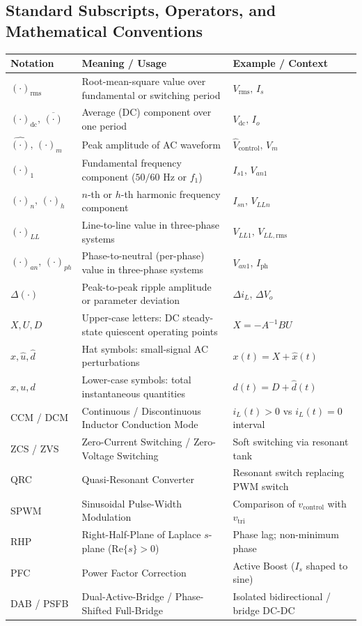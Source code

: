 \subsection{Standard Subscripts, Operators, and Mathematical Conventions}
\begin{center}
\begin{tabular}{@{}l p{9.0cm} p{5.5cm}@{}}
\toprule
\textbf{Notation} & \textbf{Meaning / Usage} & \textbf{Example / Context} \\
\midrule
$(\cdot)_{\mathrm{rms}}$ & Root-mean-square value over fundamental or switching period & $V_{\mathrm{rms}},\, I_s$ \\
$(\cdot)_{\mathrm{dc}},\, \overline{(\cdot)}$ & Average (DC) component over one period & $V_{\mathrm{dc}},\, I_o$ \\
$\hat{(\cdot)},\, (\cdot)_m$ & Peak amplitude of AC waveform & $\hat{V}_{\mathrm{control}},\, V_m$ \\
$(\cdot)_1$ & Fundamental frequency component ($50/60\text{ Hz}$ or $f_1$) & $I_{s1},\, V_{an1}$ \\
$(\cdot)_n,\, (\cdot)_h$ & $n$-th or $h$-th harmonic frequency component & $I_{sn},\, V_{LLn}$ \\
$(\cdot)_{LL}$ & Line-to-line value in three-phase systems & $V_{LL1},\, V_{LL,\mathrm{rms}}$ \\
$(\cdot)_{an},\, (\cdot)_{ph}$ & Phase-to-neutral (per-phase) value in three-phase systems & $V_{an1},\, I_{\mathrm{ph}}$ \\
$\Delta(\cdot)$ & Peak-to-peak ripple amplitude or parameter deviation & $\Delta i_L,\, \Delta V_o$ \\
$X, U, D$ & Upper-case letters: DC steady-state quiescent operating points & $X = -A^{-1}BU$ \\
$\hat{x}, \hat{u}, \hat{d}$ & Hat symbols: small-signal AC perturbations & $x(t) = X + \hat{x}(t)$ \\
$x, u, d$ & Lower-case symbols: total instantaneous quantities & $d(t) = D + \hat{d}(t)$ \\
CCM / DCM & Continuous / Discontinuous Inductor Conduction Mode & $i_L(t) > 0$ vs $i_L(t) = 0$ interval \\
ZCS / ZVS & Zero-Current Switching / Zero-Voltage Switching & Soft switching via resonant tank \\
QRC & Quasi-Resonant Converter & Resonant switch replacing PWM switch \\
SPWM & Sinusoidal Pulse-Width Modulation & Comparison of $v_{\mathrm{control}}$ with $v_{\mathrm{tri}}$ \\
RHP & Right-Half-Plane of Laplace $s$-plane ($\mathrm{Re}\{s\} > 0$) & Phase lag; non-minimum phase \\
PFC & Power Factor Correction & Active Boost ($I_s$ shaped to sine) \\
DAB / PSFB & Dual-Active-Bridge / Phase-Shifted Full-Bridge & Isolated bidirectional / bridge DC-DC \\
\bottomrule
\end{tabular}
\end{center}
